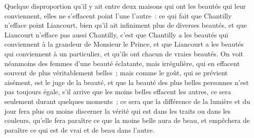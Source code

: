\documentclass[french,twoside]{book} %
\begin{document}
Quelque disproportion qu’il y ait entre deux maisons qui ont les beautés qui leur conviennent, elles ne s’effacent point l’une l’autre : ce qui fait que Chantilly n’efface point Liancourt, bien qu’il ait infiniment plus de diverses beautés, et que Liancourt n’efface pas aussi Chantilly, c’est que Chantilly a les beautés qui conviennent à la grandeur de Monsieur le Prince, et que Liancourt a les beautés qui conviennent à un particulier, et qu’ils ont chacun de vraies beautés. On voit néanmoins des femmes d’une beauté éclatante, mais irrégulière, qui en effacent souvent de plus véritablement belles ; mais comme le goût, qui se prévient aisément, est le juge de la beauté, et que la beauté des plus belles personnes n’est pas toujours égale, s’il arrive que les moins belles effacent les autres, ce sera seulement durant quelques moments ; ce sera que la différence de la lumière et du jour fera plus ou moins discerner la vérité qui est dans les traits ou dans les couleurs, qu’elle fera paraître ce que la moins belle aura de beau, et empêchera de paraître ce qui est de vrai et de beau dans l’autre.
\end{document}
